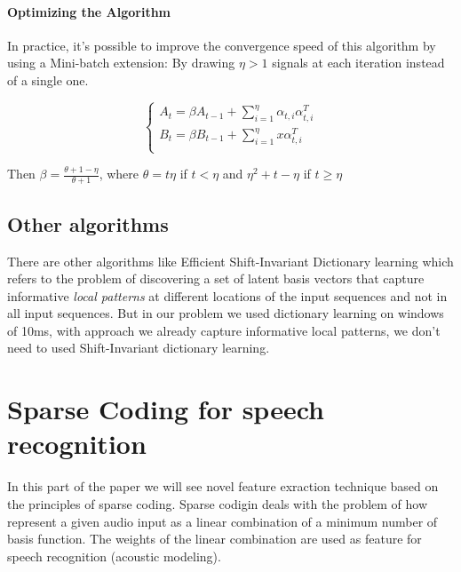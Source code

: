 \documentclass[a4paper,10pt]{article}
\begin{document}
\paragraph{Optimizing the Algorithm}
In practice, it's possible to improve the convergence speed of this algorithm by using a Mini-batch extension: By drawing $\eta > 1 $ signals at each iteration instead of a single one. 
\begin{center}
  \[    \left\{
                \begin{array}{ll}
                  A_t  = \beta A_{t-1} + \sum_{i=1}^{\eta} \alpha_{t,i}\alpha_{t,i}^{T}\\
                  B_t = \beta B_{t-1} + \sum_{i=1}^{\eta}x\alpha_{t,i}^{T}\\
                \end{array}
              \right.
  \]
\end{center}

Then $\beta = \frac{\theta + 1 - \eta}{\theta +1}$, where $\theta = t \eta$ if $ t < \eta$ and $\eta^2 + t - \eta$ if $t \geq \eta$

\subsection{Other algorithms}
There are other algorithms like Efficient Shift-Invariant Dictionary learning which refers to the problem of discovering a set of latent basis vectors that capture informative \textit{local patterns} at different locations of the input sequences and not in all input sequences\cite{Zheng:2016:ESD:2939672.2939824}. But in our problem we used dictionary learning on windows of 10ms, with approach we already capture informative local patterns, we don't need to used Shift-Invariant dictionary learning.

\section{Sparse Coding for speech recognition}
In this part of the paper we will see novel feature exraction technique based on the principles of sparse coding. Sparse codigin deals with the problem of how represent a given audio input as a linear combination of a minimum number of basis function. The weights of the linear combination are used as feature for speech recognition (acoustic modeling).


\end{document}
